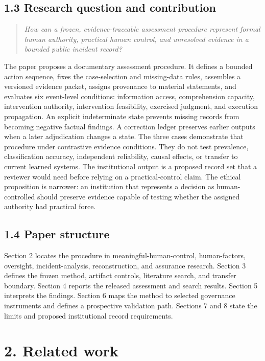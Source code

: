 \documentclass[11pt]{article}
\begin{document}
\subsection*{1.3 Research question and contribution}
\begin{quote}\itshape
How can a frozen, evidence-traceable assessment procedure represent formal human authority, practical human control, and unresolved evidence in a bounded public incident record?
\end{quote}
The paper proposes a documentary assessment procedure. It defines a bounded action sequence, fixes the case-selection and missing-data rules, assembles a versioned evidence packet, assigns provenance to material statements, and evaluates six event-level conditions: information access, comprehension capacity, intervention authority, intervention feasibility, exercised judgment, and execution propagation. An explicit indeterminate state prevents missing records from becoming negative factual findings. A correction ledger preserves earlier outputs when a later adjudication changes a state.
The three cases demonstrate that procedure under contrastive evidence conditions. They do not test prevalence, classification accuracy, independent reliability, causal effects, or transfer to current learned systems. The institutional output is a proposed record set that a reviewer would need before relying on a practical-control claim. The ethical proposition is narrower: an institution that represents a decision as human-controlled should preserve evidence capable of testing whether the assigned authority had practical force.
\subsection*{1.4 Paper structure}
Section 2 locates the procedure in meaningful-human-control, human-factors, oversight, incident-analysis, reconstruction, and assurance research. Section 3 defines the frozen method, artifact controls, literature search, and transfer boundary. Section 4 reports the released assessment and search results. Section 5 interprets the findings. Section 6 maps the method to selected governance instruments and defines a prospective validation path. Sections 7 and 8 state the limits and proposed institutional record requirements.
\FloatBarrier
\section*{2. Related work}
\end{document}
